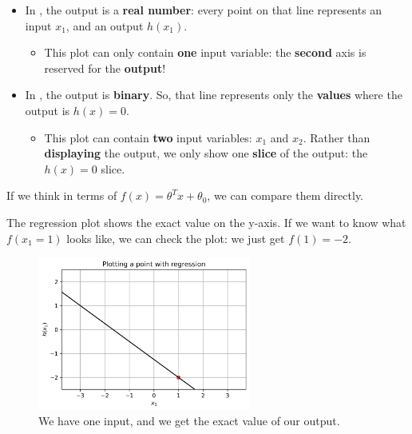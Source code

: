         \begin{itemize}
            \item In , the output is a \textbf{real number}: every point on that line represents an input $x_1$, and an output $h(x_1)$.
                
                \begin{itemize}
                    \item This plot can only contain \textbf{one} input variable: the \textbf{second} axis is reserved for the \textbf{output}!
                \end{itemize}
            
            \item In , the output is \textbf{binary}. So, that line represents only the \textbf{values} where the output is $h(x)=0$. 
                \begin{itemize}
                    \item This plot can contain \textbf{two} input variables: $x_1$ and $x_2$. Rather than \textbf{displaying} the output, we only show one \textbf{slice} of the output: the $h(x)=0$ slice.
                \end{itemize}
        \end{itemize}
        
        If we think in terms of $f(x) = \theta^Tx +\theta_0$, we can compare them directly.
        
        The regression plot shows the exact value on the y-axis. If we want to know what $f(x_1=1)$ looks like, we can check the plot: we just get $f(1)=-2$.
        
        \begin{figure}[H]
            \centering
            
            \includegraphics[width=70mm,scale=0.5]{images/classification_images/2d_regression_plot.png}
            \caption*{We have one input, and we get the exact value of our output.}
        \end{figure}
        
